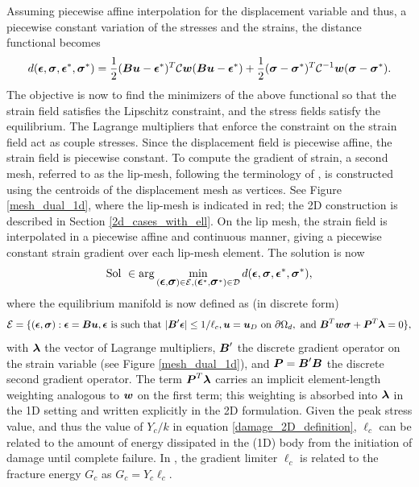 \documentclass[10pt]{cas-sc}
\newcommand{\deleted}[1]{}
\newcommand{\added}[1]{#1}
\begin{document}
Assuming piecewise affine interpolation for the displacement variable and thus, a piecewise constant variation of the stresses and the strains, the distance functional becomes
\begin{equation}
	d(\mbox{\boldmath $\epsilon$},\mbox{\boldmath $\sigma$},\mbox{\boldmath $\epsilon$}^*,\mbox{\boldmath $\sigma$}^*) = \frac{1}{2}(\mbox{\boldmath $B$} \mbox{\boldmath $u$} - \mbox{\boldmath $\epsilon$}^*)^T\mathcal{C}\mbox{\boldmath $w$}(\mbox{\boldmath $B$} \mbox{\boldmath $u$} - \mbox{\boldmath $\epsilon$}^*) + \frac{1}{2}(\mbox{\boldmath $\sigma$} - \mbox{\boldmath $\sigma$}^*)^T\mathcal{C}^{-1}\mbox{\boldmath $w$}(\mbox{\boldmath $\sigma$} - \mbox{\boldmath $\sigma$}^*).
\end{equation}
The objective is now to find the minimizers of the above functional so that the strain field satisfies the Lipschitz constraint, and the stress fields satisfy the equilibrium. The Lagrange multipliers that enforce the constraint on the strain field act as couple stresses. \added{Since the displacement field is piecewise affine, the strain field is piecewise constant. To compute the gradient of strain, a second mesh, referred to as the lip-mesh, following the terminology of \cite{Chevaugeon2021}, is constructed using the centroids of the displacement mesh as vertices. See Figure \ref{mesh_dual_1d}, where the lip-mesh is indicated in red; the 2D construction is described in Section \ref{2d_cases_with_ell}. On the lip mesh, the strain field is interpolated in a piecewise affine and continuous manner, giving a piecewise constant strain gradient over each lip-mesh element.}\deleted{The strains are interpolated on a different mesh from the one used to interpolate the displacement field, see Figure \ref{mesh_dual_1d}. The strain field is taken to vary linearly over the red mesh.} The solution is now
\begin{equation}
	\text{Sol } \in \arg \min_{(\mbox{\boldmath $\epsilon$},\mbox{\boldmath $\sigma$}) \in \mathcal{E}, (\mbox{\boldmath $\epsilon$}^*,\mbox{\boldmath $\sigma$}^*) \in \mathcal{D}} d(\mbox{\boldmath $\epsilon$},\mbox{\boldmath $\sigma$},\mbox{\boldmath $\epsilon$}^*,\mbox{\boldmath $\sigma$}^*),
\end{equation}
where the equilibrium manifold is now defined as (in discrete form)
\begin{equation}
	\mathcal{E} = \{(\mbox{\boldmath $\epsilon$},\mbox{\boldmath $\sigma$}) : \mbox{\boldmath $\epsilon$} = \mbox{\boldmath $B$} \mbox{\boldmath $u$}, \mbox{\boldmath $\epsilon$} \text{ is such that } |\mbox{\boldmath $B$}' \mbox{\boldmath $\epsilon$}|  \leq 1/{\ell_c} ,\mbox{\boldmath $u$} = \mbox{\boldmath $u$}_D \text{ on } \partial \Omega_d,
	\text{ and } \mbox{\boldmath $B$} ^T\mbox{\boldmath $w$} \mbox{\boldmath $\sigma$} + \mbox{\boldmath $P$}^T \mbox{\boldmath $\lambda$} = 0     \},
\end{equation}
with $\mbox{\boldmath $\lambda$}$ the vector of Lagrange multipliers, $\mbox{\boldmath $B$}'$ the discrete gradient operator on the strain variable (see Figure \ref{mesh_dual_1d}), and $\mbox{\boldmath $P$} = \mbox{\boldmath $B$}' \mbox{\boldmath $B$}$ the discrete second gradient operator. The term $\mbox{\boldmath $P$}^T \mbox{\boldmath $\lambda$}$ carries an implicit element-length weighting analogous to $\mbox{\boldmath $w$}$ on the first term; this weighting is absorbed into $\mbox{\boldmath $\lambda$}$ in the 1D setting and written explicitly in the 2D formulation. \added{Given the peak stress value, and thus the value of $Y_c/k$ in equation \ref{damage_2D_definition}, $\ell_c$ can be related to the amount of energy dissipated in the (1D) body from the initiation of damage until complete failure. In \cite[eq. 55]{Kamasamudram2023}, the gradient limiter $\ell_c$ is related to the fracture energy $G_c$ as $G_c = Y_c \ell_c$.}
\end{document}
